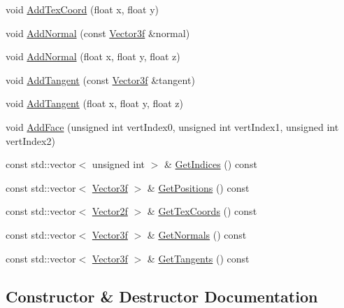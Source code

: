 \begin{DoxyCompactItemize}
\item 
void \hyperlink{class_indexed_model_a21da70d87dce12969ef9f4ececc1f457}{Add\+Tex\+Coord} (float x, float y)
\item 
void \hyperlink{class_indexed_model_a5234351972aff54068ccda7054005529}{Add\+Normal} (const \hyperlink{class_vector3f}{Vector3f} \&normal)
\item 
void \hyperlink{class_indexed_model_adffa79edb321e84b2c73cd85d65369a8}{Add\+Normal} (float x, float y, float z)
\item 
void \hyperlink{class_indexed_model_ac409f2c18136e1c5669de9782c50a452}{Add\+Tangent} (const \hyperlink{class_vector3f}{Vector3f} \&tangent)
\item 
void \hyperlink{class_indexed_model_a6a2c1ce5e751a824ba962189332bf79c}{Add\+Tangent} (float x, float y, float z)
\item 
void \hyperlink{class_indexed_model_a76422df31bb87d55fadbd5baff70c331}{Add\+Face} (unsigned int vert\+Index0, unsigned int vert\+Index1, unsigned int vert\+Index2)
\item 
const std\+::vector$<$ unsigned int $>$ \& \hyperlink{class_indexed_model_a95bc43f2719df501d635987a3ffbbbca}{Get\+Indices} () const 
\item 
const std\+::vector$<$ \hyperlink{class_vector3f}{Vector3f} $>$ \& \hyperlink{class_indexed_model_a82cdd0a943892e1dea0657c1c58f1ee2}{Get\+Positions} () const 
\item 
const std\+::vector$<$ \hyperlink{math3d_8h_a9f3739462b0605dcb64299fa289b6afe}{Vector2f} $>$ \& \hyperlink{class_indexed_model_abf332c063e230c66895129fe7b8f7d8a}{Get\+Tex\+Coords} () const 
\item 
const std\+::vector$<$ \hyperlink{class_vector3f}{Vector3f} $>$ \& \hyperlink{class_indexed_model_a01877af59d10674f69517745d9fc04bf}{Get\+Normals} () const 
\item 
const std\+::vector$<$ \hyperlink{class_vector3f}{Vector3f} $>$ \& \hyperlink{class_indexed_model_a03d5a41eec38962b9eb3a34cbe7732ab}{Get\+Tangents} () const 
\end{DoxyCompactItemize}


\subsection{Constructor \& Destructor Documentation}
\hypertarget{class_indexed_model_a1e547725f750214d5d4478ae5dda27fd}{}
